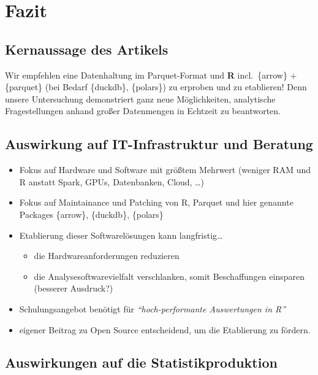 \documentclass[
  german,
  10pt,
  twoside]{article}
\providecommand{\tightlist}{%
  \setlength{\itemsep}{0pt}\setlength{\parskip}{0pt}}
\begin{document}
\section{Fazit}\label{fazit}

\subsection{Kernaussage des Artikels}\label{kernaussage-des-artikels}

Wir empfehlen eine Datenhaltung im Parquet-Format und \textbf{R}
incl.~\{arrow\} + \{parquet\} (bei Bedarf \{duckdb\}, \{polars\}) zu
erproben und zu etablieren! Denn unsere Untersuchung demonstriert ganz
neue Möglichkeiten, analytische Fragestellungen anhand großer
Datenmengen in Echtzeit zu beantworten.

\subsection{Auswirkung auf IT-Infrastruktur und
Beratung}\label{auswirkung-auf-it-infrastruktur-und-beratung}

\begin{itemize}
\tightlist
\item
  Fokus auf Hardware und Software mit größtem Mehrwert (weniger RAM und
  R anstatt Spark, GPUs, Datenbanken, Cloud, \ldots)
\item
  Fokus auf Maintainance und Patching von R, Parquet und hier genannte
  Packages \{arrow\}, \{duckdb\}, \{polars\}
\item
  Etablierung dieser Softwarelösungen kann langfristig\ldots{}

  \begin{itemize}
  \tightlist
  \item
    die Hardwareanforderungen reduzieren
  \item
    die Analysesoftwarevielfalt verschlanken, somit Beschaffungen
    einsparen (besserer Ausdruck?)
  \end{itemize}
\item
  Schulungsangebot benötigt für \emph{``hoch-performante Auswertungen in
  R''}
\item
  eigener Beitrag zu Open Source entscheidend, um die Etablierung zu
  fördern.
\end{itemize}

\subsection{Auswirkungen auf die
Statistikproduktion}\label{auswirkungen-auf-die-statistikproduktion}
\end{document}
